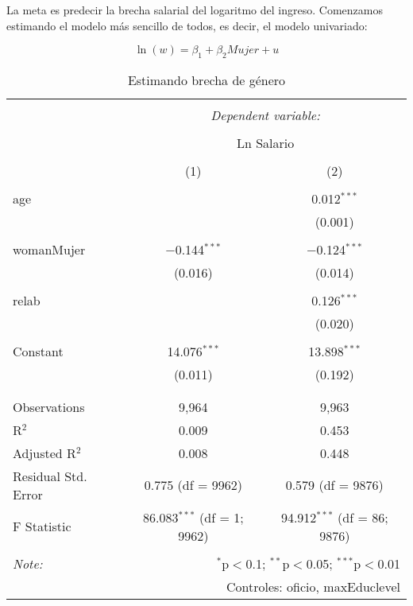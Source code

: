 \documentclass[
  11pt,
  letterpaper,
]{article}
\begin{document}
La meta es predecir la brecha salarial del logaritmo del ingreso.
Comenzamos estimando el modelo más sencillo de todos, es decir, el
modelo univariado:

\begin{equation}
\ln (w) = \beta_1 + \beta_2 Mujer+u
  \label{gap0}
\end{equation}

\begin{table}[H] \centering 
  \caption{Estimando brecha de género} 
  \label{} 
\begin{tabular}{@{\extracolsep{5pt}}lcc} 
\\[-1.8ex]\hline 
\hline \\[-1.8ex] 
 & \multicolumn{2}{c}{\textit{Dependent variable:}} \\ 
\cline{2-3} 
\\[-1.8ex] & \multicolumn{2}{c}{Ln Salario} \\ 
\\[-1.8ex] & (1) & (2)\\ 
\hline \\[-1.8ex] 
 age &  & 0.012$^{***}$ \\ 
  &  & (0.001) \\ 
  & & \\ 
 womanMujer & $-$0.144$^{***}$ & $-$0.124$^{***}$ \\ 
  & (0.016) & (0.014) \\ 
  & & \\ 
 relab &  & 0.126$^{***}$ \\ 
  &  & (0.020) \\ 
  & & \\ 
 Constant & 14.076$^{***}$ & 13.898$^{***}$ \\ 
  & (0.011) & (0.192) \\ 
  & & \\ 
\hline \\[-1.8ex] 
Observations & 9,964 & 9,963 \\ 
R$^{2}$ & 0.009 & 0.453 \\ 
Adjusted R$^{2}$ & 0.008 & 0.448 \\ 
Residual Std. Error & 0.775 (df = 9962) & 0.579 (df = 9876) \\ 
F Statistic & 86.083$^{***}$ (df = 1; 9962) & 94.912$^{***}$ (df = 86; 9876) \\ 
\hline 
\hline \\[-1.8ex] 
\textit{Note:}  & \multicolumn{2}{r}{$^{*}$p$<$0.1; $^{**}$p$<$0.05; $^{***}$p$<$0.01} \\ 
 & \multicolumn{2}{r}{Controles: oficio, maxEduclevel} \\ 
\end{tabular} 
\end{table}
\end{document}
